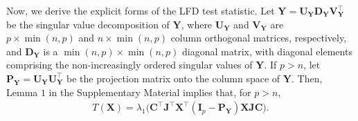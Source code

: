 \documentclass[12pt]{article} %
\newcommand{\bX}{\mathbf{X}}
\newcommand{\bP}{\mathbf{P}}
\newcommand{\bY}{\mathbf{Y}}
\newcommand{\bJ}{\mathbf{J}}
\newcommand{\bC}{\mathbf{C}}
\newcommand{\bI}{\mathbf{I}}
\newcommand{\bU}{\mathbf{U}}
\newcommand{\bD}{\mathbf{D}}
\newcommand{\bV}{\mathbf{V}}
\theoremstyle{definition}
\begin{document}
Now, we derive the explicit forms of the LFD test statistic. 
Let $\bY=\bU_{\bY}\bD_{\bY}\bV_{\bY}^\top$ be the singular value decomposition of $\bY$, where $\bU_{\bY}$ and $\bV_{\bY}$ are $p\times \min(n,p)$ and $n \times \min(n,p)$ column orthogonal matrices, respectively, and $\bD_{\bY}$ is a $\min(n,p)\times \min(n,p)$ diagonal matrix, with diagonal elements comprising the non-increasingly ordered singular values of $\bY$.
If $p>n$, let $\bP_{\bY}=\bU_{\bY}\bU_{\bY}^\top$ be the projection matrix onto the column space of $\bY$.
Then, Lemma $1$ in the Supplementary Material implies that, for $p>n$,
\begin{equation}\label{statisticForm1}
\begin{aligned}
    T(\bX)
    =\lambda_{1}\big(\bC^\top\bJ^\top\bX^\top (\bI_p-
    \bP_{\bY}
    )\bX\bJ\bC\big).
\end{aligned}
\end{equation}
\end{document}
